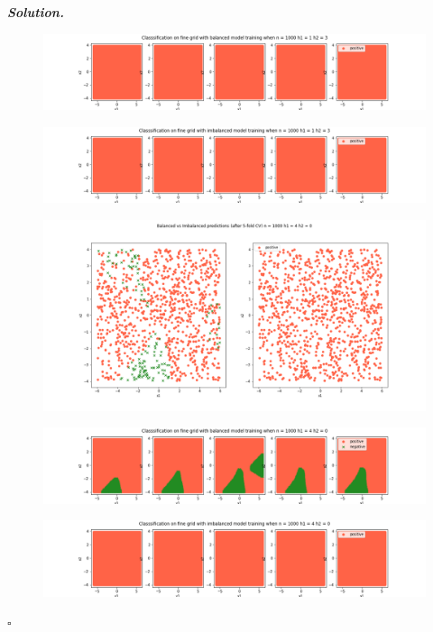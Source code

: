\documentclass[10pt]{article}
\newenvironment{solution}[1][\it{Solution}]{\textbf{#1. } }{$\square$}
\begin{document}
\begin{solution}
\begin{figure}[H]
\includegraphics[width=16cm, keepaspectratio]{./3/23}
\end{figure}
\begin{figure}[H]
\includegraphics[width=16cm, keepaspectratio]{./3/24}
\end{figure}
\begin{figure}[H]
\includegraphics[width=16cm, keepaspectratio]{./3/25}
\end{figure}
\begin{figure}[H]
\includegraphics[width=16cm, keepaspectratio]{./3/26}
\end{figure}
\begin{figure}[H]
\includegraphics[width=16cm, keepaspectratio]{./3/27}

\end{figure}
\end{solution}
\end{document}
